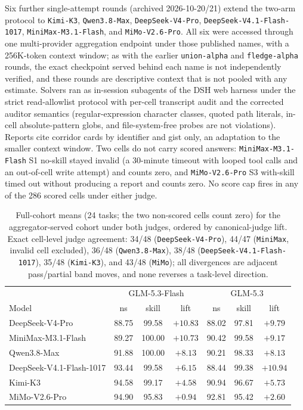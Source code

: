 \documentclass[11pt]{article}
\begin{document}
Six further single-attempt rounds (archived 2026-10-20/21) extend the two-arm protocol to \texttt{Kimi-K3}, \texttt{Qwen3.8-Max}, \texttt{DeepSeek-V4-Pro}, \texttt{DeepSeek-V4.1-Flash-1017}, \texttt{MiniMax-M3.1-Flash}, and \texttt{MiMo-V2.6-Pro}. All six were accessed through one multi-provider aggregation endpoint under those published names, with a 256K-token context window; as with the earlier \texttt{union-alpha} and \texttt{fledge-alpha} rounds, the exact checkpoint served behind each name is not independently verified, and these rounds are descriptive context that is not pooled with any estimate. Solvers ran as in-session subagents of the DSH web harness under the strict read-allowlist protocol with per-cell transcript audit and the corrected auditor semantics (regular-expression character classes, quoted path literals, in-cell absolute-pattern globs, and file-system-free probes are not violations). Reports cite corridor cards by identifier and gist only, an adaptation to the smaller context window. Two cells do not carry scored answers: \texttt{MiniMax-M3.1-Flash} S1 no-skill stayed invalid (a 30-minute timeout with looped tool calls and an out-of-cell write attempt) and counts zero, and \texttt{MiMo-V2.6-Pro} S3 with-skill timed out without producing a report and counts zero. No score cap fires in any of the 286 scored cells under either judge.

\begin{table}[t]
\centering
\small
\begin{tabular}{l ccc ccc}
\toprule
 & \multicolumn{3}{c}{GLM-5.3-Flash} & \multicolumn{3}{c}{GLM-5.3} \\
Model & ns & skill & lift & ns & skill & lift \\
\midrule
DeepSeek-V4-Pro & 88.75 & 99.58 & $+10.83$ & 88.02 & 97.81 & $+9.79$ \\
MiniMax-M3.1-Flash & 89.27 & 100.00 & $+10.73$ & 90.42 & 99.58 & $+9.17$ \\
Qwen3.8-Max & 91.88 & 100.00 & $+8.13$ & 90.21 & 98.33 & $+8.13$ \\
DeepSeek-V4.1-Flash-1017 & 93.44 & 99.58 & $+6.15$ & 88.44 & 99.38 & $+10.94$ \\
Kimi-K3 & 94.58 & 99.17 & $+4.58$ & 90.94 & 96.67 & $+5.73$ \\
MiMo-V2.6-Pro & 94.90 & 95.83 & $+0.94$ & 92.81 & 95.42 & $+2.60$ \\
\bottomrule
\end{tabular}
\caption{Full-cohort means (24 tasks; the two non-scored cells count zero) for the aggregator-served cohort under both judges, ordered by canonical-judge lift. Exact cell-level judge agreement: 34/48 (\texttt{DeepSeek-V4-Pro}), 44/47 (\texttt{MiniMax}, invalid cell excluded), 36/48 (\texttt{Qwen3.8-Max}), 38/48 (\texttt{DeepSeek-V4.1-Flash-1017}), 35/48 (\texttt{Kimi-K3}), and 43/48 (\texttt{MiMo}); all divergences are adjacent pass/partial band moves, and none reverses a task-level direction.}
\label{tab:newmodel_means}
\end{table}
\end{document}
